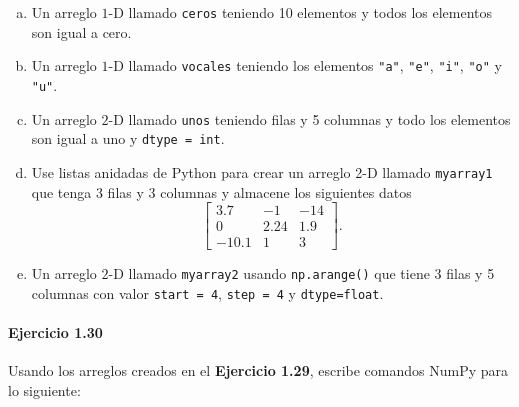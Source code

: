 \begin{enumerate}[(a)]
	\item

	      Un arreglo $1$-D llamado \texttt{ceros} teniendo
	      10 elementos y todos los elementos son igual a cero.

	\item

	      Un arreglo $1$-D llamado \texttt{vocales}
	      teniendo los elementos \texttt{"a"},
	      \texttt{"e"}, \texttt{"i"},
	      \texttt{"o"} y \texttt{"u"}.

	\item

	      Un arreglo $2$-D llamado \texttt{unos} teniendo
	      filas y 5 columnas y todo los elementos son igual a uno y
	      \texttt{dtype = int}.

	\item

	      Use listas anidadas de Python para crear un arreglo 2-D
	      llamado \texttt{myarray1} que tenga 3 filas y 3
	      columnas y almacene los siguientes datos
	      \begin{equation*}
		      \begin{bmatrix}
			      3.7   & -1   & -14 \\
			      0     & 2.24 & 1.9 \\
			      -10.1 & 1    & 3
		      \end{bmatrix}.
	      \end{equation*}

	\item

	      Un arreglo $2$-D llamado \texttt{myarray2} usando
	      \texttt{np.arange()} que tiene 3 filas y 5
	      columnas con valor \texttt{start = 4},
	      \texttt{step = 4} y
	      \texttt{dtype=float}.
\end{enumerate}

\paragraph{\color{DarkBlue}Ejercicio 1.30}
Usando los arreglos creados en el
\textbf{\color{DarkBlue}Ejercicio 1.29}, escribe comandos NumPy para
lo siguiente:

